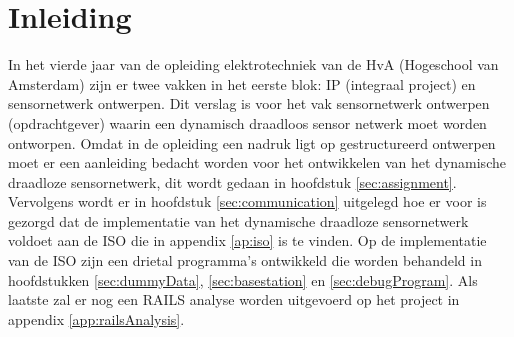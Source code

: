 \section{Inleiding}

In het vierde jaar van de opleiding elektrotechniek van de HvA (Hogeschool van Amsterdam) zijn er twee vakken in het eerste blok: IP (integraal project) en sensornetwerk ontwerpen. Dit verslag is voor het vak sensornetwerk ontwerpen (opdrachtgever) waarin een dynamisch draadloos sensor netwerk moet worden ontworpen. Omdat in de opleiding een nadruk ligt op gestructureerd ontwerpen moet er een aanleiding bedacht worden voor het ontwikkelen van het dynamische draadloze sensornetwerk, dit wordt gedaan in hoofdstuk \ref{sec:assignment}. Vervolgens wordt er in hoofdstuk \ref{sec:communication} uitgelegd hoe er voor is gezorgd dat de implementatie van het dynamische draadloze sensornetwerk voldoet aan de ISO die in appendix \ref{ap:iso}  is te vinden. Op de implementatie van de ISO zijn een drietal programma's ontwikkeld die worden behandeld in hoofdstukken \ref{sec:dummyData}, \ref{sec:basestation} en \ref{sec:debugProgram}. Als laatste zal er nog een RAILS analyse worden uitgevoerd op het project in appendix \ref{app:railsAnalysis}.
